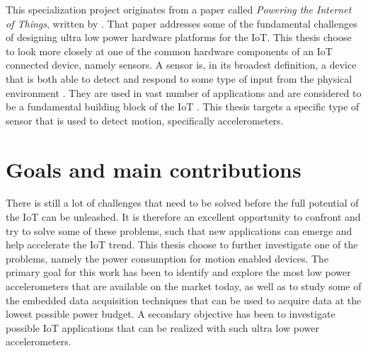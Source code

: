 
This specialization project originates from a paper called \textit{Powering the Internet of Things}, written by \cite{jayakumar14}. That paper addresses some of the fundamental challenges of designing ultra low power hardware platforms for the IoT. This thesis choose to look more closely at one of the common hardware components of an IoT connected device, namely sensors. A sensor is, in its broadest definition, a device that is both able to detect and respond to some type of input from the physical environment \cite{wigmore12}. They are used in vast number of applications and are considered to be a fundamental building block of the IoT \cite{jayakumar14}. This thesis targets a specific type of sensor that is used to detect motion, specifically accelerometers. 





\section{Goals and main contributions}

There is still a lot of challenges that need to be solved before the full potential of the IoT can be unleashed. It is therefore an excellent opportunity to confront and try to solve some of these problems, such that new applications can emerge and help accelerate the IoT trend. This thesis choose to further investigate one of the problems, namely the power consumption for motion enabled devices. The primary goal for this work has been to identify and explore the most low power accelerometers that are available on the market today, as well as to study some of the embedded data acquisition techniques that can be used to acquire data at the lowest possible power budget. A secondary objective has been to investigate possible IoT applications that can be realized with such ultra low power accelerometers.

